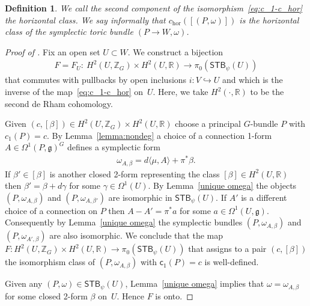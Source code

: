 \documentclass[10pt,a4paper]{amsart}
\numberwithin{equation}{section}
\newtheorem{Definition}[Lemma]{Definition}
\begin{document}
\begin{Definition}\sloppy
  We call the second component of the isomorphism~\eqref{eq:c_1-c_hor}
  the {\em horizontal class}. We say informally that
  $c_{\text{hor}}([(P,\omega)])$ is the horizontal class of the symplectic toric
bundle \mbox{$(P\to W, \omega)$}.
\end{Definition}

\begin{proof}[Proof of ]
Fix an open set $U\subset W$.  We construct a bijection
\begin{gather*}
F=F_U\colon \  H^2 (U, {\mathbb Z}_G)\times H^2 (U,{\mathbb R})\to
\pi_0({\textsf{STB}}_\psi (U))
\end{gather*}
that commutes with pullbacks by open inclusions $i\colon V\hookrightarrow U$
and which is the inverse of the map~\eqref{eq:c_1-c_hor} on~$U$.
Here, we take $H^2(\cdot,{\mathbb R})$ to be the second de Rham cohomology.

Given $(c, [\beta]) \in H^2 (U, {\mathbb Z}_G)\times H^2 (U,{\mathbb R}) $ choose a
principal $G$-bundle $P$ with $c_1 (P) = c$.  By
Lemma~\ref{lemma:nondeg} a choice of a connection 1-form $A\in
\Omega^1(P,{\mathfrak g})^G$ def\/ines a symplectic form
\begin{gather*}
\omega_{A,\beta} = d \langle \mu, A\rangle + \pi^*\beta.
\end{gather*}
If $\beta' \in [\beta]$ is another closed 2-form representing the
class $[\beta]\in H^2(U, {\mathbb R})$ then $\beta' = \beta + d\gamma$ for some
$\gamma\in \Omega^1(U)$.  By Lemma~\ref{unique omega} the objects
$(P,\omega_{A,\beta})$ and $(P,\omega_{A,\beta'})$ are isomorphic in
${\textsf{STB}}_\psi (U)$.  If $A'$ is a dif\/ferent choice of a connection on $P$
then $A-A' = \pi^*a$ for some $a\in \Omega^1 (U,{\mathfrak g})$.  Consequently
by Lemma~\ref{unique omega} the symplectic bundles  $(P,\omega_{A, \beta})$ and
$(P,\omega_{A',\beta})$ are also isomorphic.  We conclude that the map
$F\colon H^2 (U, {\mathbb Z}_G)\times H^2 (U,{\mathbb R}) \to \pi_0({\textsf{STB}}_\psi (U))$ that
assigns to a pair $(c,[\beta])$ the isomorphism class of
$(P,\omega_{A,\beta})$ with ${\textsf{c}}_1(P) = c$ is well-def\/ined.

Given any $(P,\omega)\in {\textsf{STB}}_\psi(U)$, Lemma~\ref{unique omega}
implies that $\omega= \omega_{A,\beta}$ for some closed 2-form $\beta$
on~$U$.  Hence $F$ is onto.


\end{proof}
\end{document}
